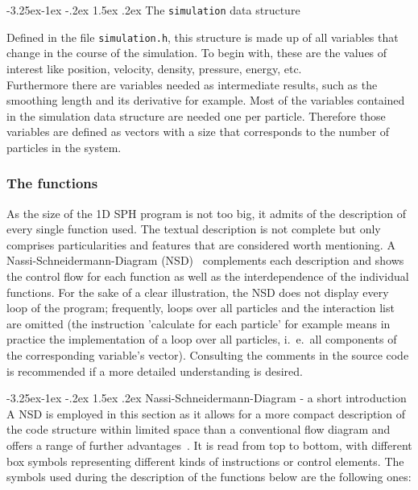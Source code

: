\documentclass{report}
\makeatletter
\renewcommand\paragraph{\@startsection{paragraph}{4}{\z@}%
  {-3.25ex\@plus -1ex \@minus -.2ex}%
  {1.5ex \@plus .2ex}%
  {\normalfont\normalsize\bfseries}}
\makeatother
\begin{document}
\paragraph{The {\tt simulation} data structure}

Defined in the file {\tt simulation.h}, this structure is made up of all 
variables that change in the course of the simulation. To begin with, these are the 
values of interest like position, velocity, density, pressure, energy, etc.\\ 
Furthermore there are variables needed as intermediate results, such as the smoothing 
length and its derivative for example. 
Most of the variables contained in the simulation data structure are needed one per 
particle. Therefore those variables are defined as vectors with a size that corresponds 
to the number of particles in the system. 

\subsubsection{The functions}

As the size of the 1D SPH program is not too big, it admits of the description of every single function used. The textual description is not complete but only comprises particularities and features that are considered worth mentioning. A Nassi-Schneidermann-Diagram (NSD)~\cite{Nassi1973} complements each description and shows the control flow for each function as well as the interdependence of the individual functions. For the sake of a clear illustration, the NSD does not display every loop of the program; frequently, loops over all particles and the interaction list are omitted (the instruction 'calculate for each particle' for example means in practice the implementation of a loop over all particles, i.\ e.\, all components of the corresponding variable's vector).  Consulting the comments in the source code is recommended if a more detailed understanding is desired.

\paragraph{Nassi-Schneidermann-Diagram - a short introduction}
A NSD is employed in this section as it allows for a more compact description of the code structure within limited space than a conventional flow diagram and offers a range of further advantages~\cite{Nassi1973}. It is read from top to bottom, with different box symbols representing different kinds of instructions or control elements. The symbols used during the description of the functions below are the following ones:
\end{document}
